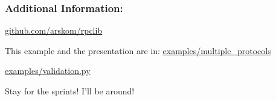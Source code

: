 \documentclass{beamer}
\begin{document}
\begin{frame}
  \frametitle{Additional Information:}

  \begin{center}
  \huge

  \href{http://github.com/arskom/rpclib}{github.com/arskom/rpclib}

  \bigskip

  \large

  This example and the presentation are in:
  \href{https://github.com/arskom/rpclib/tree/master/examples/multiple_protocols}{examples/multiple\_protocols}

  \href{https://github.com/arskom/rpclib/tree/master/examples/validation.py}{examples/validation.py}

  \bigskip

  Stay for the sprints! I'll be around!

  \end{center}

\end{frame}
\end{document}
